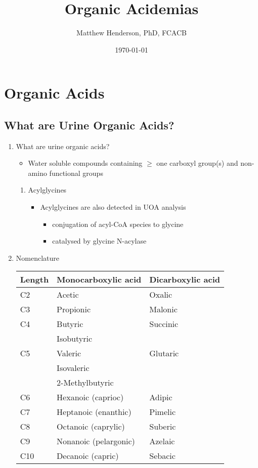\documentclass{scrartcl}
\author{Matthew Henderson, PhD, FCACB}
\date{\today}
\title{Organic Acidemias}
\begin{document}
\maketitle
\tableofcontents


\section{Organic Acids}
\label{sec:orge5b1ef0}
\subsection{What are Urine Organic Acids?}
\label{sec:org7f8a2e4}
\begin{enumerate}
\item What are urine organic acids?
\label{sec:org34455df}
\begin{itemize}
\item Water soluble compounds containing \(\ge\) one carboxyl group(s) and
non-amino functional groups
\end{itemize}


\centering
{}


\begin{enumerate}
\item Acylglycines
\label{sec:org7d37be8}
\begin{itemize}
\item Acylglycines are also detected in UOA analysis
\begin{itemize}
\item conjugation of acyl-CoA species to glycine
\item catalysed by glycine N-acylase
\end{itemize}
\end{itemize}
\end{enumerate}

\item Nomenclature
\label{sec:org1c6d2e1}

\begin{center}
\begin{tabular}{lll}
Length & Monocarboxylic acid & Dicarboxylic acid\\
\hline
C2 & Acetic & Oxalic\\
C3 & Propionic & Malonic\\
C4 & Butyric & Succinic\\
 & Isobutyric & \\
C5 & Valeric & Glutaric\\
 & Isovaleric & \\
 & 2-Methylbutyric & \\
C6 & Hexanoic (caprioc) & Adipic\\
C7 & Heptanoic (enanthic) & Pimelic\\
C8 & Octanoic (caprylic) & Suberic\\
C9 & Nonanoic (pelargonic) & Azelaic\\
C10 & Decanoic (capric) & Sebacic\\
\end{tabular}
\end{center}


\end{enumerate}
\end{document}
